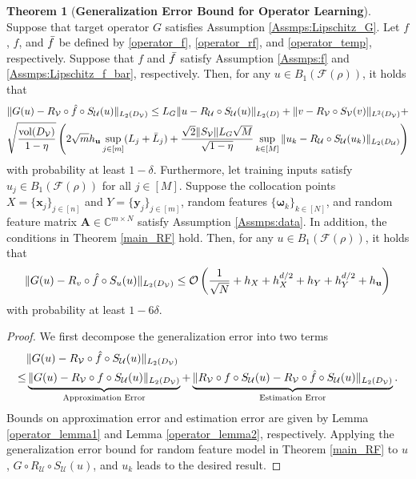 \documentclass[11pt,twoside]{article}
\theoremstyle{plain}
\theoremstyle{definition}
\newtheorem{theorem}[lemma]{Theorem}
\theoremstyle{remark}
\newcommand{\C}{\mathbb{C}}
\newcommand{\Ab}{\mathbf{A}}
\newcommand{\xb}{\mathbf{x}}
\newcommand{\yb}{\mathbf{y}}
\newcommand{\ub}{\mathbf{u}}
\newcommand{\Uc}{\mathcal{U}}
\newcommand{\Vc}{\mathcal{V}}
\newcommand{\Fc}{\mathcal{F}}
\newcommand{\vol}{\mathop{\mathrm{vol}}}
\newcommand{\omegab}{\boldsymbol\omega}
\begin{document}
\begin{theorem}[{\bf Generalization Error Bound for Operator Learning}]
\label{OL_error}
Suppose that target operator $G$ satisfies Assumption \ref{Assmps:Lipschitz_G}. Let $f$, $\hat{f}$, and $\Bar{f}$ be defined by \eqref{operator_f}, \eqref{operator_rf}, and  \eqref{operator_temp}, respectively. Suppose that $f$ and $\Bar{f}$ satisfy Assumption \ref{Assmps:f} and \ref{Assmps:Lipschitz_f_bar}, respectively.
Then, for any $u\in B_1(\Fc(\rho))$, it holds that
\begin{equation*}
\begin{aligned}
& \|G(u) - R_\Vc\circ\Hat{f}\circ S_\Uc(u)\|_{L_2(D_\Vc)} \leq L_G \| u - R_\Uc\circ S_\Uc(u)\|_{L_2(D)} + \| v - R_\Vc \circ S_\Vc(v)\|_{L^2(D_\Vc)} + \\ 
& \sqrt{\frac{\vol(D_\Vc)}{1-\eta}} \left( 2\sqrt{m}h_\ub\sup_{j\in[m]}(L_j+\Bar{L}_j) + \frac{\sqrt{2}\|S_\Vc\| L_G\sqrt{M}}{\sqrt{1-\eta}} \sup_{k\in[M]}\| u_k - R_\Uc\circ S_\Uc(u_k)\|_{L_2(D_\Uc)} \right)
\end{aligned}
\end{equation*}
with probability at least $1-\delta$.
Furthermore, let training inputs satisfy $u_j\in B_1(\Fc(\rho))$ for all $j\in[M]$.
Suppose the collocation points $X=\{\xb_j\}_{j\in[n]}$ and $Y=\{\yb_j\}_{j\in[m]}$, random features $\{\omegab_k\}_{k\in[N]}$, and random feature matrix $\Ab\in\C^{m\times N}$ satisfy Assumption \ref{Assmps:data}. In addition, the conditions in Theorem \ref{main_RF} hold.
Then, for any $u\in B_1(\Fc(\rho))$, it holds that
\begin{equation*}
\|G(u) - R_v\circ\Hat{f}\circ S_u(u)\|_{L_2(D_\Vc)} \leq \mathcal{O}\left(\frac{1}{\sqrt{N}} + h_X + h_X^{d/2} + h_Y + h_Y^{d/2} + h_\ub \right)
\end{equation*}
with probability at least $1-6\delta$.
\end{theorem}
\begin{proof}
We first decompose the generalization error into two terms
\begin{equation*}
\begin{aligned}
& \|G(u) - R_\Vc\circ\Hat{f}\circ S_\Uc(u)\|_{L_2(D_\Vc)} \\
\leq& \underbrace{\|G(u) - R_\Vc\circ f\circ S_\Uc(u)\|_{L_2(D_\Vc)}}_{\text{Approximation Error}} + \underbrace{ \|R_\Vc\circ f\circ S_\Uc(u) - R_\Vc\circ\Hat{f}\circ S_\Uc(u)\|_{L_2(D_\Vc)} }_{\text{Estimation Error}}.
\end{aligned}
\end{equation*}
Bounds on approximation error and estimation error are given by Lemma \ref{operator_lemma1} and Lemma \ref{operator_lemma2}, respectively. 
Applying the generalization error bound for random feature model in Theorem \ref{main_RF} to $u$, $G\circ R_\Uc \circ S_\Uc(u)$, and $u_k$ leads to the desired result.
\end{proof}
\end{document}
